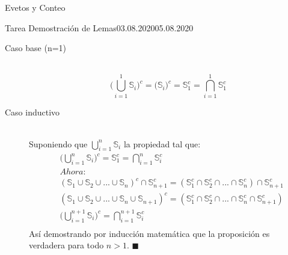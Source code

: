 \documentclass[a4paper]{book}
\begin{document}
\begin{chapter}{Evetos y Conteo}
\begin{tarea}{Tarea Demostración de Lemas}{03.08.2020}{05.08.2020}
\begin{enumerate}
                    \begin{description}
                        \item[Caso base (n=1)]\\
                        \begin{equation*}
                        \label{eq:1.17}
                        \Big(\bigcup_{i=1}^{1}\mathbb S_{i}\Big)^{c} =
                            \Big(\mathbb S_{i}\Big)^{c} = \mathbb
                            S_{1}^{c}=\bigcap_{i=1}^{1}\mathbb S_{1}^{c}
                        \end{equation*}
                        \np
                        \item[Caso inductivo]\\
                            Suponiendo que $\bigcup_{i=1}^{n}\mathbb S_{i}$ la propiedad tal que:
                            \begin{equation*}
                            \label{eq:1.18}
                            \begin{split}
                            &\Big(\bigcup_{i=1}^{n}\mathbb S_{i}\Big)^{c} =
                                \mathbb S_{1}^{c}=\bigcap_{i=1}^{n}\mathbb
                                S_{i}^{c}\\
                            &Ahora:\\
                            &\left(\mathbb S_{1}\cup\mathbb
                                S_{2}\cup...\cup\mathbb
                                S_{n}\right)^{c}\cap\mathbb S_{n+1}^{c}
                                =\left(\mathbb S_{1}^{c}\cap\mathbb
                                S_{2}^{c}\cap...\cap\mathbb
                                S_{n}^{c}\right)\cap\mathbb S_{n+1}^{c}\\
                            &\left(\mathbb S_{1}\cup\mathbb
                                S_{2}\cup...\cup\mathbb S_{n}\cup\mathbb
                                S_{n+1}\right)^{c}=\left(\mathbb
                                S_{1}^{c}\cap\mathbb
                                S_{2}^{c}\cap...\cap\mathbb
                                S_{n}^{c}\cap\mathbb S_{n+1}^{c}\right)\\
                            &\Big(\bigcup_{i=1}^{n+1}\mathbb
                                S_{i}\Big)^{c}=\bigcap_{i=1}^{n+1}\mathbb
                                S_{i}^{c}\\
                            \end{split}
                            \end{equation*}
                            Así demostrando por inducción matemática que la
                            proposición es verdadera para todo $n>1$.
                            $\blacksquare$


\end{description}
\end{enumerate}
\end{tarea}
\end{chapter}
\end{document}
